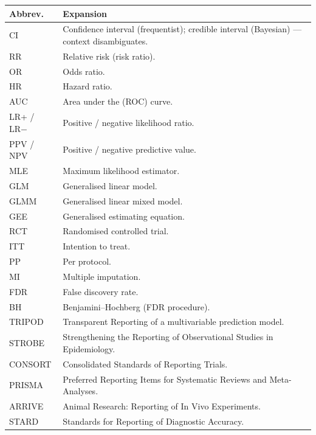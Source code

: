 \documentclass[
]{article}
\newcounter{none} %
\begin{document}
{\def\LTcaptype{none} %
\begin{longtable}[]{@{}
  >{\raggedright\arraybackslash}p{}
  >{\raggedright\arraybackslash}p{}@{}}
\toprule\noalign{}
\begin{minipage}[b]{\linewidth}\raggedright
Abbrev.
\end{minipage} & \begin{minipage}[b]{\linewidth}\raggedright
Expansion
\end{minipage} \\
\midrule\noalign{}
\endhead
\bottomrule\noalign{}
\endlastfoot
CI & Confidence interval (frequentist); credible interval (Bayesian) ---
context disambiguates. \\
RR & Relative risk (risk ratio). \\
OR & Odds ratio. \\
HR & Hazard ratio. \\
AUC & Area under the (ROC) curve. \\
LR+ / LR− & Positive / negative likelihood ratio. \\
PPV / NPV & Positive / negative predictive value. \\
MLE & Maximum likelihood estimator. \\
GLM & Generalised linear model. \\
GLMM & Generalised linear mixed model. \\
GEE & Generalised estimating equation. \\
RCT & Randomised controlled trial. \\
ITT & Intention to treat. \\
PP & Per protocol. \\
MI & Multiple imputation. \\
FDR & False discovery rate. \\
BH & Benjamini--Hochberg (FDR procedure). \\
TRIPOD & Transparent Reporting of a multivariable prediction model. \\
STROBE & Strengthening the Reporting of Observational Studies in
Epidemiology. \\
CONSORT & Consolidated Standards of Reporting Trials. \\
PRISMA & Preferred Reporting Items for Systematic Reviews and
Meta-Analyses. \\
ARRIVE & Animal Research: Reporting of In Vivo Experiments. \\
STARD & Standards for Reporting of Diagnostic Accuracy. \\
\end{longtable}
}
\end{document}
